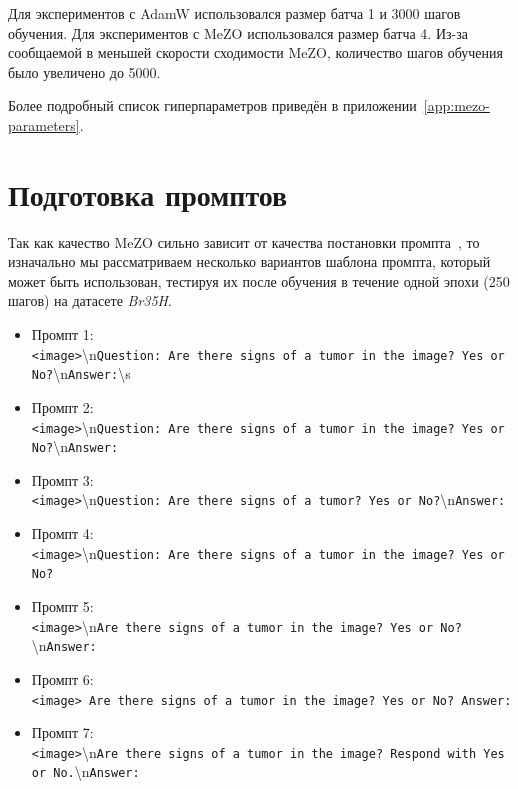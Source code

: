 \documentclass[LI,KR]{HSEUniversity}
\begin{document}
Для экспериментов с AdamW использовался размер батча 1 и 3000 шагов обучения.
Для экспериментов с MeZO использовался размер батча 4.
Из-за сообщаемой в \cite{mezo} меньшей скорости сходимости MeZO, количество шагов обучения было увеличено до 5000.

Более подробный список гиперпараметров приведён в приложении~\ref{app:mezo-parameters}.

\section{Подготовка промптов}

Так как качество MeZO сильно зависит от качества постановки промпта~\cite{mezo},
то изначально мы рассматриваем несколько вариантов шаблона промпта, который может быть использован,
тестируя их после обучения в течение одной эпохи (250 шагов) на датасете \textit{Br35H}.

\begin{itemize}[leftmargin=10mm]
    \item Промпт 1:\\
    \small{\texttt{<image>}\textbackslash n\texttt{Question: Are there signs of a tumor in the image? Yes or No?}\textbackslash n\texttt{Answer:}\textbackslash s}

    \item Промпт 2:\\
    \small{\texttt{<image>}\textbackslash n\texttt{Question: Are there signs of a tumor in the image? Yes or No?}\textbackslash n\texttt{Answer:}}

    \item Промпт 3:\\
    \small{\texttt{<image>}\textbackslash n\texttt{Question: Are there signs of a tumor? Yes or No?}\textbackslash n\texttt{Answer:}}

    \item Промпт 4:\\
    \small{\texttt{<image>}\textbackslash n\texttt{Question: Are there signs of a tumor in the image? Yes or No?}}

    \item Промпт 5:\\
    \small{\texttt{<image>}\textbackslash n\texttt{Are there signs of a tumor in the image? Yes or No?}\textbackslash n\texttt{Answer:}}

    \item Промпт 6:\\
    \small{\texttt{<image> Are there signs of a tumor in the image? Yes or No? Answer:}}

    \item Промпт 7:\\
    \small{\texttt{<image>}\textbackslash n\texttt{Are there signs of a tumor in the image? Respond with Yes or No.}\textbackslash n\texttt{Answer:}}
\end{itemize}
\end{document}
